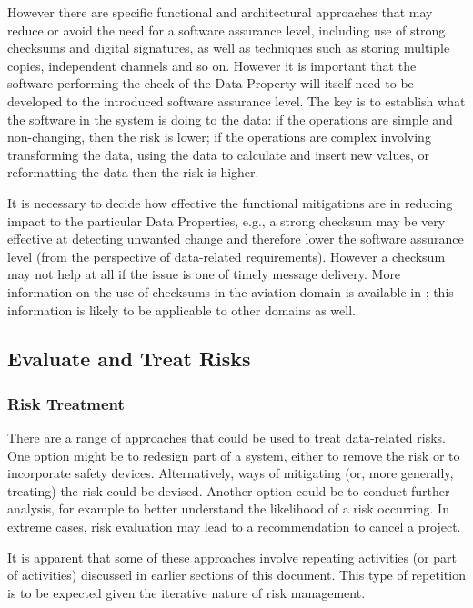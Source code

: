 However there are specific functional and architectural approaches that may reduce or avoid the need for a \gls{software assurance level}, including use of strong checksums and digital signatures, as well as techniques such as storing multiple copies, independent channels and so on. However it is important that the software performing the check of the Data Property will itself need to be developed to the introduced \gls{software assurance level}. The key is to establish what the software in the system is doing to the data: if the operations are simple and non-changing, then the risk is lower; if the operations are complex involving transforming the data, using the data to calculate and insert new values, or reformatting the data then the risk is higher.

It is necessary to decide how effective the functional mitigations are in reducing impact to the particular Data Properties, e.g., a strong checksum may be very effective at detecting unwanted change and therefore lower the \gls{software assurance level} (from the perspective of data-related requirements). However a checksum may not help at all if the issue is one of timely message delivery. More information on the use of checksums in the aviation domain is available in \cite{citation:koopman2015selection}; this information is likely to be applicable to other domains as well.

\clearpage %
\subsection{Evaluate and Treat Risks}
\label{bkm:EvaluateAndTreat}
\subsubsection{Risk Treatment}
There are a range of approaches that could be used to treat data-related risks. One option might be to redesign part of a system, either to remove the risk or to incorporate safety devices. Alternatively, ways of mitigating (or, more generally, treating) the risk could be devised. Another option could be to conduct further analysis, for example to better understand the likelihood of a risk occurring. In extreme cases, risk evaluation may lead to a recommendation to cancel a project.

It is apparent that some of these approaches involve repeating activities (or part of activities) discussed in earlier sections of this document. This type of repetition is to be expected given the iterative nature of risk management.

